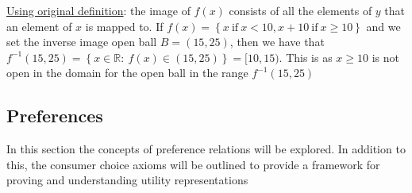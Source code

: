 \documentclass{article}
\begin{document}
  \par
  \underline{Using original definition}: the image of $f(x)$ consists of all the elements of $y$ that an element of $x$ is mapped to. If $f(x) = \left\{x \ \text{if} \ x < 10, x + 10 \ \text{if} \ x \geq 10 \right\}$ and we set the inverse image open ball $B = (15, 25)$, then  we have that $f^{-1}(15,25) = \left\{ x \in \mathbb{R}: \ f(x) \in (15, 25) \right\} = [10, 15)$. This is as $x \geq 10$ is not open in the domain for the open ball in the range $f^{-1}(15,25)$
  \par

\newpage

\vspace{2.5mm}
\subsection{Preferences}
In this section the concepts of preference relations will be explored. In addition to this, the consumer choice axioms will be outlined to provide a framework for proving and understanding utility representations \par
\vspace{6mm}
\end{document}

